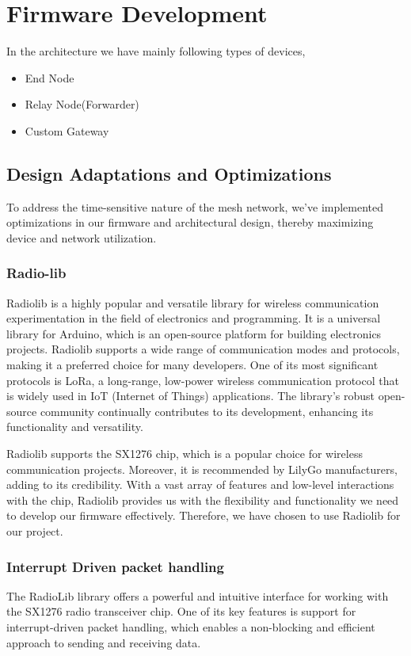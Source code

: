 \section{Firmware Development}\label{ch:firmware}
In the architecture we have mainly following types of devices,
\begin{itemize}
    \item End Node
    \item Relay Node(Forwarder)
    \item Custom Gateway
\end{itemize}

\subsection{Design Adaptations and Optimizations}

To address the time-sensitive nature of the mesh network, we've implemented optimizations in our firmware and architectural design, thereby maximizing device and network utilization.

\subsubsection{Radio-lib}


Radiolib is a highly popular and versatile library for wireless communication experimentation in the field of electronics and programming. It is a universal library for Arduino, which is an open-source platform for building electronics projects. Radiolib supports a wide range of communication modes and protocols, making it a preferred choice for many developers. One of its most significant protocols is LoRa, a long-range, low-power wireless communication protocol that is widely used in IoT (Internet of Things) applications. The library's robust open-source community continually contributes to its development, enhancing its functionality and versatility.

Radiolib supports the SX1276 chip, which is a popular choice for wireless communication projects. Moreover, it is recommended by LilyGo manufacturers, adding to its credibility. With a vast array of features and low-level interactions with the chip, Radiolib provides us with the flexibility and functionality we need to develop our firmware effectively. Therefore, we have chosen to use Radiolib for our project.

\subsubsection{Interrupt Driven packet handling}
The RadioLib library offers a powerful and intuitive interface for working with the SX1276 radio transceiver chip. One of its key features is support for interrupt-driven packet handling, which enables a non-blocking and efficient approach to sending and receiving data.

